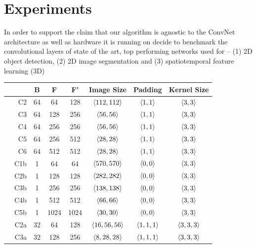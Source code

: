 \section{Experiments}

  In order to support the claim that our algorithm is agnostic to the
  ConvNet architecture as well as hardware it is running on decide to
  benchmark the convolutional layers of state of the art, top
  performing networks used for -- (1) 2D object detection, (2) 2D
  image segmentation and (3) spatiotemporal feature learning (3D)

  \begin{table} \centering
    \setlength\tabcolsep{2.5pt}
    \begin{tabular}{cr !{\vrule width0.8pt} cccccc  }
      &  & B & F & F' & Image Size & Padding & Kernel Size  \\
      \hline
      & C2 & 64  & 64  &  128 & $\langle112,112\rangle$ & $\langle1,1\rangle$ & $\langle3,3\rangle$ \\
      & C3 & 64  & 128 &  256 & $\langle56,56\rangle$   & $\langle1,1\rangle$ & $\langle3,3\rangle$ \\
      & C4 & 64  & 256 &  256 & $\langle56,56\rangle$   & $\langle1,1\rangle$ & $\langle3,3\rangle$ \\
      & C5 & 64  & 256 &  512 & $\langle28,28\rangle$   & $\langle1,1\rangle$ & $\langle3,3\rangle$ \\
      & C6 & 64  & 512 &  512 & $\langle28,28\rangle$   & $\langle1,1\rangle$ & $\langle3,3\rangle$ \\
      \hline
      & C1b & 1  & 64  &  64 & $\langle570,570\rangle$  & $\langle0,0\rangle$ & $\langle3,3\rangle$ \\
      & C2b & 1  & 128 &  128 & $\langle282,282\rangle$ & $\langle0,0\rangle$ & $\langle3,3\rangle$ \\
      & C3b & 1  & 256 &  256 & $\langle138,138\rangle$ & $\langle0,0\rangle$ & $\langle3,3\rangle$ \\
      & C4b & 1  & 512 &  512 & $\langle66,66\rangle$   & $\langle0,0\rangle$ & $\langle3,3\rangle$ \\
      & C5b & 1  & 1024 &  1024 & $\langle30,30\rangle$ & $\langle0,0\rangle$ & $\langle3,3\rangle$ \\
      \hline
      & C2a & 32  & 64  &  128 & $\langle16,56,56\rangle$ & $\langle1,1,1\rangle$ & $\langle3,3,3\rangle$ \\
      & C3a & 32  & 128 &  256 & $\langle8,28,28\rangle$ & $\langle1,1,1\rangle$ & $\langle3,3,3\rangle$ \\

\end{tabular}
\end{table}
